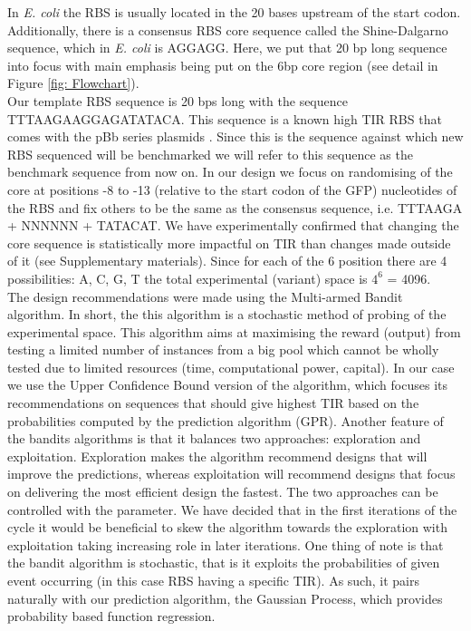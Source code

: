 \documentclass{article}
\begin{document}
In \emph{E. coli} the RBS is usually located in the 20 bases upstream of the start codon. 
Additionally, there is a consensus RBS core sequence called the Shine-Dalgarno sequence, which in \emph{E. coli} is AGGAGG. 
Here, we put that 20 bp long sequence into focus with main emphasis being put on the 6bp core region (see detail in Figure \ref{fig: Flowchart}).\\

Our template RBS sequence is 20 bps long with the sequence TTTAAGAAGGAGATATACA.
This sequence is a known high TIR RBS that comes with the pBb series plasmids \cite{Lee2011}. 
Since this is the sequence against which new RBS sequenced will be benchmarked we will refer to this sequence as the benchmark sequence from now on.
In our design we focus on randomising of the core at positions -8 to -13 (relative to the start codon of the GFP) nucleotides of the RBS and fix others to be the same as the consensus sequence, i.e. TTTAAGA + NNNNNN + TATACAT.
We have experimentally confirmed that changing the core sequence is statistically more impactful on TIR than changes made outside of it (see Supplementary materials). 
Since for each of the 6 position there are 4 possibilities: A, C, G, T the total experimental (variant) space is $4^6$ = 4096.\\

The design recommendations were made using the Multi-armed Bandit algorithm.
In short, the this algorithm is a stochastic method of probing of the experimental space. 
This algorithm aims at maximising the reward (output) from testing a limited number of instances from a big pool which cannot be wholly tested due to limited resources (time, computational power, capital). 
In our case we use the Upper Confidence Bound version of the algorithm, which focuses its recommendations on sequences that should give highest TIR based on the probabilities computed by the prediction algorithm (GPR). 
Another feature of the bandits algorithms is that it balances two approaches: exploration and exploitation. 
Exploration makes the algorithm recommend designs that will improve the predictions, whereas exploitation will recommend designs that focus on delivering the most efficient design the fastest. 
The two approaches can be controlled with the \textbeta\enspace parameter. 
We have decided that in the first iterations of the cycle it would be beneficial to skew the algorithm towards the exploration with exploitation taking increasing role in later iterations. 
One thing of note is that the bandit algorithm is stochastic, that is it exploits the probabilities of given event occurring (in this case RBS having a specific TIR). 
As such, it pairs naturally with our prediction algorithm, the Gaussian Process, which provides probability based function regression.
\\
\end{document}
